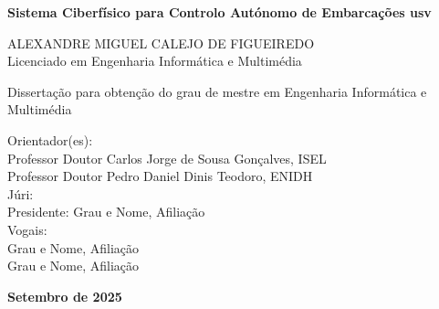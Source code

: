 \begin{titlepage}
	\vspace*{1cm}	
	\begin{center}
		\LARGE
		\textbf{Sistema Ciberfísico para Controlo Autónomo de Embarcações \acrlong{usv}}\\\vspace{36pt}
	\end{center}\vfill

	\begin{center}
		\Large
		ALEXANDRE MIGUEL CALEJO DE FIGUEIREDO\\
		\large
		Licenciado em Engenharia Informática e Multimédia
	\end{center}\vfill

	\begin{center}
		\normalsize
        Dissertação para obtenção do grau de mestre em Engenharia Informática e Multimédia
	\end{center}\vfill
	
	\normalsize
	\noindent\hspace*{3.5cm}
	Orientador(es):\\
	\noindent\hspace*{5.5cm}
	  Professor Doutor Carlos Jorge de Sousa Gonçalves, ISEL\\
	\noindent\hspace*{5.5cm}
	Professor Doutor Pedro Daniel Dinis Teodoro, ENIDH\\
	
	\noindent\hspace*{3.5cm}
	Júri:\\
	\noindent\hspace*{4.2cm}
	Presidente: Grau e Nome, Afiliação\\
	\noindent\hspace*{4.2cm}
	Vogais:\\
	\noindent\hspace*{5.5cm}
	Grau e Nome, Afiliação\\
	\noindent\hspace*{5.5cm}
	Grau e Nome, Afiliação\\
	
	\vfill
	\begin{center}
		\textbf{Setembro de 2025}
	\end{center}
\end{titlepage}

\thispagestyle{empty} %

\thispagestyle{empty} %

\linespread{1.3}







